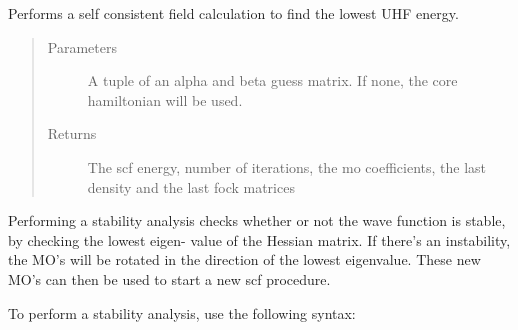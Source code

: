 \documentclass[letterpaper,10pt,english]{sphinxmanual}
\begin{document}
\begin{fulllineitems}
\begin{fulllineitems}
\begin{quote}
\begin{description}
\end{description}\end{quote}

\end{fulllineitems}


\begin{fulllineitems}
\label{\detokenize{UHF:ghf.UHF.UHF.scf}}
Performs a self consistent field calculation to find the lowest UHF energy.
\begin{quote}\begin{description}
\item[{Parameters}] \leavevmode
{} \textendash{} A tuple of an alpha and beta guess matrix. If none, the core hamiltonian will be used.

\item[{Returns}] \leavevmode
The scf energy, number of iterations, the mo coefficients, the last density and the last fock matrices

\end{description}\end{quote}

\end{fulllineitems}


\begin{fulllineitems}
\label{\detokenize{UHF:ghf.UHF.UHF.stability}}
Performing a stability analysis checks whether or not the wave function is stable, by checking the lowest eigen-
value of the Hessian matrix. If there’s an instability, the MO’s will be rotated in the direction
of the lowest eigenvalue. These new MO’s can then be used to start a new scf procedure.

To perform a stability analysis, use the following syntax:


\end{fulllineitems}
\end{fulllineitems}
\end{document}

